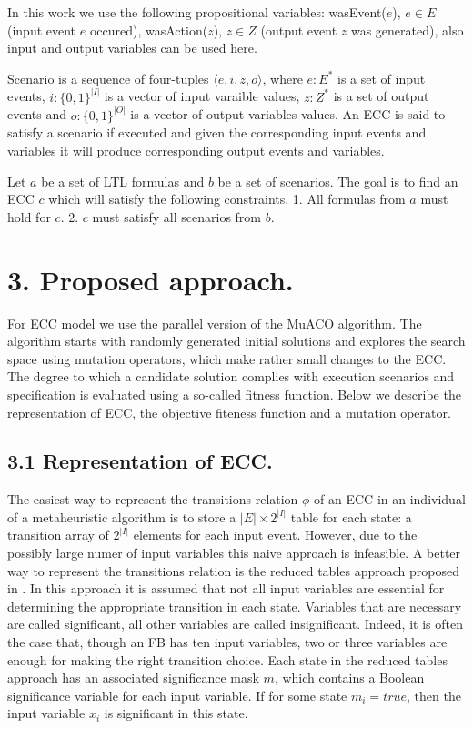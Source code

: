 \documentclass[fleqn,twocolumn]{article}
\begin{document}
In this work we use the following propositional variables: wasEvent($e$), $e \in E$ (input event $e$ occured), wasAction($z$),
$z \in Z$ (output event $z$ was generated), also input and output variables can be used here.

Scenario is a sequence of four-tuples $\langle e, i, z, o \rangle$, where $e : E^*$ is a set of input events, $i : \{0,1\}^{|I|}$ is
a vector of input varaible values, $z : Z^*$ is a set of output events and $o : \{0,1\}^{|O|}$ is a vector of output variables values.
An ECC is said to satisfy a scenario if executed and given the corresponding input events and variables it will produce corresponding
output events and variables.

Let $a$ be a set of LTL formulas and $b$ be a set of scenarios. The goal is to find an ECC $c$ which will satisfy the following constraints.
1. All formulas from $a$ must hold for $c$.
2. $c$ must satisfy all scenarios from $b$.

\section{3. Proposed approach.}

For ECC model we use the parallel version of the MuACO algorithm. The algorithm starts with randomly generated initial solutions and explores
the search space using mutation operators, which make rather small changes to the ECC. The degree to which a candidate solution complies
with execution scenarios and specification is evaluated using a so-called fitness function. Below we describe the representation of ECC,
the objective fiteness function and a mutation operator.

\subsection{3.1 Representation of ECC.}

The easiest way to represent the transitions relation $\phi$ of an ECC in an individual of a metaheuristic algorithm is to store a $|E| \times 2^{|I|}$
table for each state: a transition array of $2^{|I|}$ elements for each input event. However, due to the possibly large numer of input variables this
naive approach is infeasible. A better way to represent the transitions relation is the reduced tables approach proposed in \cite{mrt}. In this approach it is
assumed that not all input variables are essential for determining the appropriate transition in each state. Variables that are necessary are called
significant, all other variables are called insignificant. Indeed, it is often the case that, though an FB has ten input variables, two or three variables are
enough for making the right transition choice. Each state in the reduced tables approach has an associated significance mask $m$, which contains a Boolean
significance variable for each input variable. If for some state $m_i = true$, then the input variable $x_i$ is significant in this state.
\end{document}
